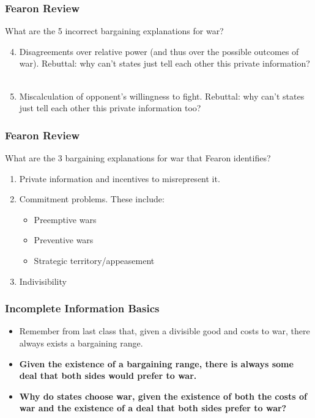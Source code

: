 \documentclass[handout]{beamer}
\begin{document}
\begin{frame} 
	\frametitle{\LARGE{Fearon Review}}
	What are the 5 incorrect bargaining explanations for war? 
	\begin{enumerate}
		\setcounter{enumi}{3}
		\item Disagreements over relative power (and thus over the possible outcomes of war). \pause Rebuttal: why can't states just tell each other this private information?
			\\~\\
		\item Miscalculation of opponent's willingness to fight. \pause Rebuttal: why can't states just tell each other this private information too?
	\end{enumerate}
\end{frame}

\begin{frame} 
	\frametitle{\LARGE{Fearon Review}}
	What are the 3 bargaining explanations for war that Fearon identifies? \pause
	\begin{enumerate}
		\item Private information and incentives to misrepresent it.
		\item Commitment problems. These include: \pause
		\begin{itemize}
			\item Preemptive wars
			\item Preventive wars
			\item Strategic territory/appeasement
		\end{itemize}
		\item Indivisibility
	\end{enumerate}
\end{frame}

\begin{frame} 
	\frametitle{\LARGE{Incomplete Information Basics}}
	\begin{itemize}
		\item Remember from last class that, given a divisible good and costs to war, there always exists a bargaining range. \pause
		\item \textbf{Given the existence of a bargaining range, there is always some deal that both sides would prefer to war.} \pause
		\item \textbf{Why do states choose war, given the existence of both the costs of war and the existence of a deal that both sides prefer to war?}
	\end{itemize}
\end{frame}
\end{document}
